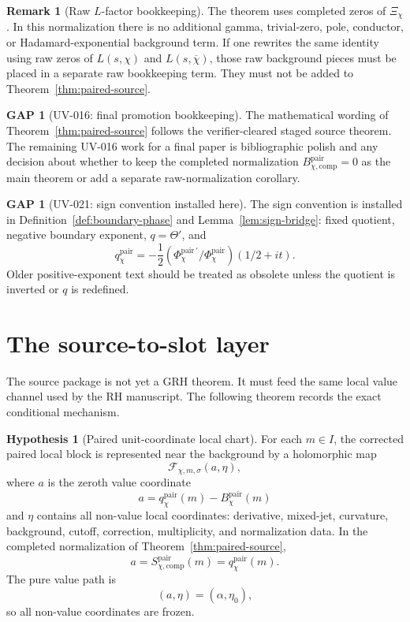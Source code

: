 \documentclass[11pt,a4paper]{amsart}
\theoremstyle{plain}
\theoremstyle{definition}
\newtheorem{hypothesis}[theorem]{Hypothesis}
\newtheorem{gap}[theorem]{GAP}
\newtheorem{remark}[theorem]{Remark}
\newcommand{\GRH}{\mathrm{GRH}}
\newcommand{\pair}{\mathrm{pair}}
\newcommand{\comp}{\mathrm{comp}}
\newcommand{\calF}{\mathcal F}
\begin{document}
\begin{remark}[Raw \(L\)-factor bookkeeping]
The theorem uses completed zeros of
\(\Xi_\chi\).  In this normalization there is no additional gamma,
trivial-zero, pole, conductor, or Hadamard-exponential background term.  If one
rewrites the same identity using raw zeros of \(L(s,\chi)\) and
\(L(s,\overline\chi)\), those raw background pieces must be placed in a
separate raw bookkeeping term.  They must not be added to
Theorem~\ref{thm:paired-source}.
\end{remark}

\begin{gap}[UV-016: final promotion bookkeeping]
\label{gap:uv016}
The mathematical wording of Theorem~\ref{thm:paired-source} follows the
verifier-cleared staged source theorem.  The remaining UV-016 work for a final
paper is bibliographic polish and any decision about whether to keep the
completed normalization \(B_{\chi,\comp}^{\pair}=0\) as the main theorem or add
a separate raw-normalization corollary.
\end{gap}

\begin{gap}[UV-021: sign convention installed here]
\label{gap:uv021}
The sign convention is installed in Definition~\ref{def:boundary-phase} and
Lemma~\ref{lem:sign-bridge}: fixed quotient, negative boundary exponent,
\(q=\Theta'\), and
\[
  q_\chi^{\pair}
  =
  -\frac12
  (\Phi_\chi^{\pair\,\prime}/\Phi_\chi^{\pair})(1/2+it).
\]
Older positive-exponent text should be treated as obsolete unless the quotient
is inverted or \(q\) is redefined.
\end{gap}

\section{The source-to-slot layer}
\label{sec:slot}

The source package is not yet a \(\GRH\) theorem.  It must feed the same local
value channel used by the RH manuscript.  The following theorem records the
exact conditional mechanism.

\begin{hypothesis}[Paired unit-coordinate local chart]
\label{hyp:unit-coordinate}
For each \(m\in I\), the corrected paired local block is represented near the
background by a holomorphic map
\[
  \calF_{\chi,m,\sigma}(a,\eta),
\]
where \(a\) is the zeroth value coordinate
\[
  a=q_\chi^{\pair}(m)-B_\chi^{\pair}(m)
\]
and \(\eta\) contains all non-value local coordinates: derivative, mixed-jet,
curvature, background, cutoff, correction, multiplicity, and normalization
data.  In the completed normalization of Theorem~\ref{thm:paired-source},
\[
  a=S_{\chi,\comp}^{\pair}(m)=q_\chi^{\pair}(m).
\]
The pure value path is
\[
  (a,\eta)=(\alpha,\eta_0),
\]
so all non-value coordinates are frozen.
\end{hypothesis}
\end{document}
